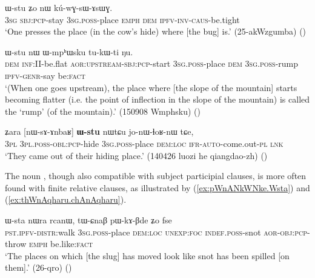 \begin{exe}
\ex \label{ex:kWrAZi.Wstu}
  ɯ-stu ʑo nɯ kú-wɣ-sɯ-ɤsɯɣ. \\
\textsc{3sg} \textsc{sbj}:\textsc{pcp}-stay \textsc{3sg}.\textsc{poss}-place \textsc{emph} \textsc{dem} \textsc{ipfv}-\textsc{inv}-\textsc{caus}-be.tight \\
\glt `One presses the place (in the cow's hide) where [the bug] is.' (25-akWzgumba)
()
\end{exe}

\begin{exe}
\ex \label{ex:tAntAm.lAkWZa.Wstu}
  ɯ-stu nɯ ɯ-mpʰɯsku tu-kɯ-ti ŋu. \\
\textsc{dem} \textsc{inf}:II-be.flat \textsc{aor}:\textsc{upstream}-\textsc{sbj}:\textsc{pcp}-start \textsc{3sg}.\textsc{poss}-place \textsc{dem} \textsc{3sg}.\textsc{poss}-rump \textsc{ipfv}-\textsc{genr}-say be:\textsc{fact} \\
\glt  `(When one goes upstream), the place where [the slope of the mountain] starts becoming flatter (i.e. the point of inflection in the slope of the mountain) is called  the `rump' (of the mountain).' (150908 Wmphsku)
()
\end{exe}
 
\begin{exe}
\ex \label{ex:nWsAnbaR.Wstu}
 \gll ʑara [nɯ-sɤ-ɤnbaʁ] \textbf{ɯ-stu} nɯtɕu jo-nɯ-ɬoʁ-nɯ tɕe, \\
 \textsc{3pl} \textsc{3pl}.\textsc{poss}-\textsc{obl}:\textsc{pcp}-hide \textsc{3sg}.\textsc{poss}-place \textsc{dem}:\textsc{loc} \textsc{ifr}-\textsc{auto}-come.out-\textsc{pl} \textsc{lnk} \\
 \glt `They came out of their hiding place.' (140426 luozi he qiangdao-zh)
 ()
\end{exe}

The noun , though also compatible with subject participial clauses, is more often found with finite relative clauses, as illustrated by  (\ref{ex:pWnANkWNke.Wsta}) and (\ref{ex:thWnAqharu.chAnAqharu}).  

\begin{exe}
\ex \label{ex:pWnANkWNke.Wsta}
 \gll  [pɯ-nɤŋkɯŋke] ɯ-sta nɯra rcanɯ, tɯ-ɕnaβ pɯ-kɤ-βde ʑo fse \\
 \textsc{pst}.\textsc{ipfv}-\textsc{distr}:walk \textsc{3sg}.\textsc{poss}-place \textsc{dem}:\textsc{loc} \textsc{unexp}:\textsc{foc} \textsc{indef}.\textsc{poss}-snot \textsc{aor}-\textsc{obj}:\textsc{pcp}-throw \textsc{emph} be.like:\textsc{fact} \\
 \glt `The places on which [the slug] has moved look like snot has been spilled  [on them].' (26-qro)
 ()
 \end{exe}


